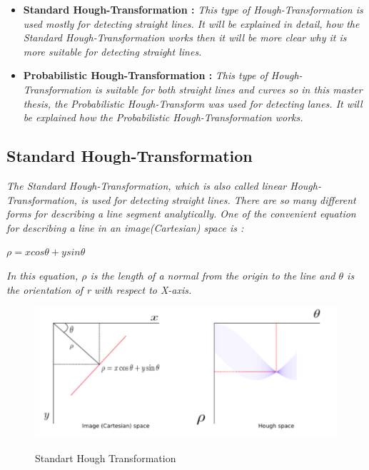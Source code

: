 \begin{itemize}

\item \textbf{Standard Hough-Transformation : }\emph{\color{blue}This type of Hough-Transformation is used mostly for detecting straight lines. It will be explained in detail, how the Standard Hough-Transformation works then it will be more clear why it is more suitable for detecting straight lines.}

\item \textbf{Probabilistic Hough-Transformation : }\emph{\color{blue} This type of Hough-Transformation is suitable for both straight lines and curves so in this master thesis, the Probabilistic Hough-Transform was used for detecting lanes. It will be explained how the Probabilistic Hough-Transformation works.}

\end{itemize}
%
\subsection{Standard Hough-Transformation}\label{sec:Standard Hough - Transformation}
%
\emph{\color{blue}The Standard Hough-Transformation, which is also called linear Hough-Transformation, is used for detecting straight lines. There are so many different forms for describing a line segment analytically. One of the convenient equation for describing a line in an image(Cartesian) space is :}

  \begin{center}

$ \rho = x cos \theta + y sin \theta $

  \end{center}
  
 \emph{\color{red} In this equation, \textit{$ \rho $} is the length of a normal from the origin to the line and \textit{$ \theta $} is the orientation of \textit{r} with respect to X-axis.}
 
 
 \begin{figure}[H]
 \centering
  \includegraphics[width=1\textwidth]{./Bilder/Standard_Hough_Transformation.png}\label{Standart_Hough_Transformation}
  \caption{Standart Hough Transformation\cite{Standart_Hough_Transformation}}
\end{figure}
 
